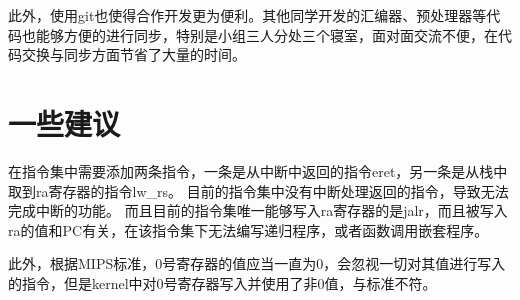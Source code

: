     此外，使用git也使得合作开发更为便利。其他同学开发的汇编器、预处理器等代码也能够方便的进行同步，特别是小组三人分处三个寝室，面对面交流不便，在代码交换与同步方面节省了大量的时间。

\section{一些建议}
  在指令集中需要添加两条指令，一条是从中断中返回的指令eret，另一条是从栈中取到ra寄存器的指令lw_rs。
  目前的指令集中没有中断处理返回的指令，导致无法完成中断的功能。
  而且目前的指令集唯一能够写入ra寄存器的是jalr，而且被写入ra的值和PC有关，在该指令集下无法编写递归程序，或者函数调用嵌套程序。

  此外，根据MIPS标准，0号寄存器的值应当一直为0，会忽视一切对其值进行写入的指令，但是kernel中对0号寄存器写入并使用了非0值，与标准不符。



